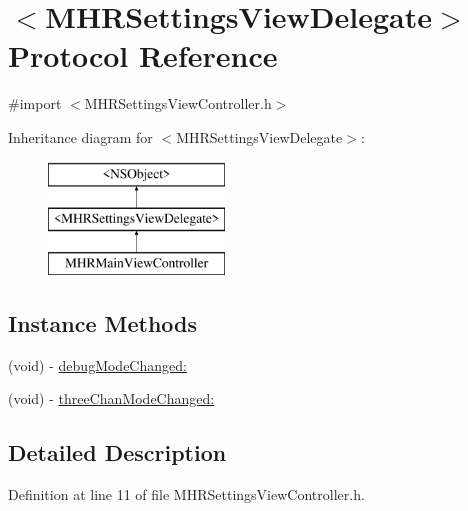 \hypertarget{protocol_m_h_r_settings_view_delegate-p}{\section{$<$M\+H\+R\+Settings\+View\+Delegate$>$ Protocol Reference}
\label{protocol_m_h_r_settings_view_delegate-p}
}


{\ttfamily \#import $<$M\+H\+R\+Settings\+View\+Controller.\+h$>$}

Inheritance diagram for $<$M\+H\+R\+Settings\+View\+Delegate$>$\+:\begin{figure}[H]
\begin{center}
\leavevmode
\includegraphics[height=3.000000cm]{protocol_m_h_r_settings_view_delegate-p}
\end{center}
\end{figure}
\subsection*{Instance Methods}
\begin{DoxyCompactItemize}
\item 
(void) -\/ \hyperlink{protocol_m_h_r_settings_view_delegate-p_a1d7367b2d59c2dce76e953607bdc032e}{debug\+Mode\+Changed\+:}
\item 
(void) -\/ \hyperlink{protocol_m_h_r_settings_view_delegate-p_ade012e6adf8df6a09d7a51909815f360}{three\+Chan\+Mode\+Changed\+:}
\end{DoxyCompactItemize}


\subsection{Detailed Description}


Definition at line 11 of file M\+H\+R\+Settings\+View\+Controller.\+h.




